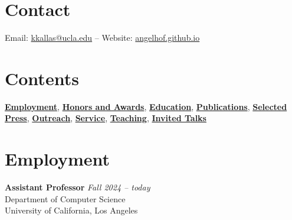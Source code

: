 \documentclass[margin]{res}
\begin{document}
\begin{resume}

\section{Contact} 
Email: \href{mailto:kkallas@ucla.edu}{kkallas@ucla.edu} -- Website: \href{https://angelhof.github.io/}{angelhof.github.io}


\section{Contents}

\hyperlink{sec:employment}{\textbf{Employment}},
\hyperlink{sec:honors}{\textbf{Honors and Awards}},
\hyperlink{sec:education}{\textbf{Education}},
\hyperlink{sec:publications}{\textbf{Publications}},
\hyperlink{sec:press}{\textbf{Selected Press}},
\hyperlink{sec:outreach}{\textbf{Outreach}},
\hyperlink{sec:service}{\textbf{Service}},
\hyperlink{sec:teaching}{\textbf{Teaching}},
\hyperlink{sec:talks}{\textbf{Invited Talks}}

\section{Employment}
\hypertarget{sec:employment}{}

\textbf{Assistant Professor} \hfill {\em Fall 2024 -- today} \\
Department of Computer Science \\
University of California, Los Angeles


\end{resume}
\end{document}
